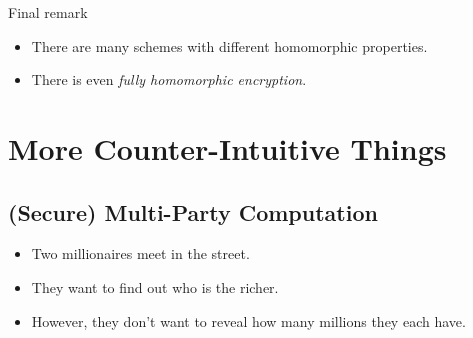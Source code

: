 \begin{frame}
  \begin{block}{Final remark}
    \begin{itemize}
      \item There are many schemes with different homomorphic properties.
      \item There is even \emph{fully homomorphic encryption}.
    \end{itemize}
  \end{block}
\end{frame}


\section{More Counter-Intuitive Things}

\subsection{(Secure) Multi-Party Computation}

\begin{frame}
  \begin{example}
    \begin{itemize}
      \item Two millionaires meet in the street.
      \item They want to find out who is the richer.

        \pause{}

      \item However, they don't want to reveal how many millions they each 
        have.
    \end{itemize}
  \end{example}
\end{frame}

